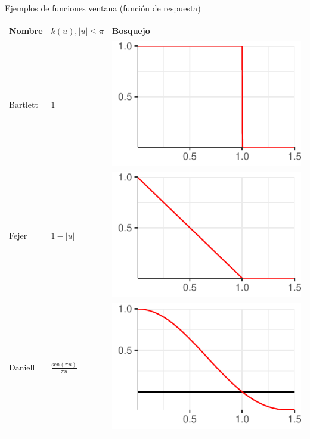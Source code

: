\documentclass[12pt,letterpaper,draft]{book}
\newcommand{\SEN}[1]{\mathrm{sen}\left( #1 \right)}
\newcommand{\abso}[1]{\left| #1 \right|}
\begin{document}
\begin{SidewaysTable}
\caption{Ejemplos de funciones ventana (función de respuesta)}
\centering
\begin{tabular*}{\textwidth}{lll}
\toprule
Nombre & $k(u), \abso{u} \leq \pi$ & Bosquejo \\
\midrule
Bartlett &
$\displaystyle 
1 
$
& \includegraphics[scale=.4]{./img_ventanas/ventana_bartlett.pdf}\\
\rowcolor{gris}
Fejer &
$\displaystyle 
1-\abso{u}
$
& \includegraphics[scale=.4]{./img_ventanas/ventana_fejer.pdf} \\
Daniell &
$\displaystyle 
\frac{\SEN{\pi u}}{\pi u}
$
& \includegraphics[scale=.4]{./img_ventanas/ventana_daniell.pdf} \\

\end{tabular*}
\end{SidewaysTable}
\end{document}
